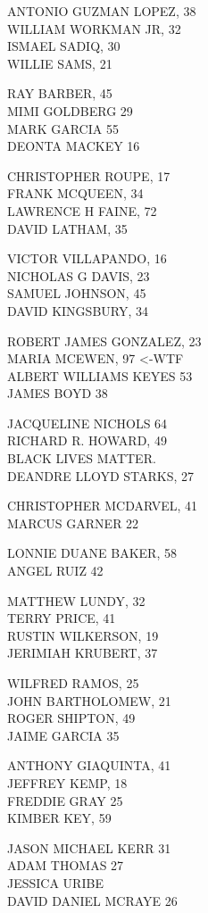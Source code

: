 \documentclass[10pt,letterpaper]{article}
\begin{document}
ANTONIO GUZMAN LOPEZ, 38\\
WILLIAM WORKMAN JR, 32\\
ISMAEL SADIQ, 30\\
WILLIE SAMS, 21

RAY BARBER, 45\\
MIMI GOLDBERG 29\\
MARK GARCIA 55\\
DEONTA MACKEY 16

CHRISTOPHER ROUPE, 17\\
FRANK MCQUEEN, 34\\
LAWRENCE H FAINE, 72\\
DAVID LATHAM, 35

VICTOR VILLAPANDO, 16\\
NICHOLAS G DAVIS, 23\\
SAMUEL JOHNSON, 45\\
DAVID KINGSBURY, 34

ROBERT JAMES GONZALEZ, 23\\
MARIA MCEWEN, 97 <{-}WTF\\
ALBERT WILLIAMS KEYES 53\\
JAMES BOYD 38

JACQUELINE NICHOLS 64\\
RICHARD R. HOWARD, 49\\
BLACK LIVES MATTER.\\
DEANDRE LLOYD STARKS, 27

CHRISTOPHER MCDARVEL, 41\\
MARCUS GARNER 22

LONNIE DUANE BAKER, 58\\
ANGEL RUIZ 42

MATTHEW LUNDY, 32\\
TERRY PRICE, 41\\
RUSTIN WILKERSON, 19\\
JERIMIAH KRUBERT, 37

WILFRED RAMOS, 25\\
JOHN BARTHOLOMEW, 21\\
ROGER SHIPTON, 49\\
JAIME GARCIA 35

ANTHONY GIAQUINTA, 41\\
JEFFREY KEMP, 18\\
FREDDIE GRAY 25\\
KIMBER KEY, 59

JASON MICHAEL KERR 31\\
ADAM THOMAS 27\\
JESSICA URIBE\\
DAVID DANIEL MCRAYE 26
\end{document}
